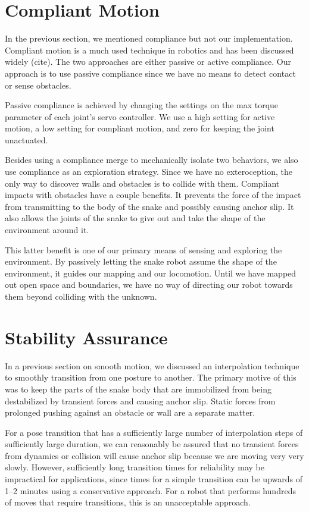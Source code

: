 \section{Compliant Motion}
\label{compliantmotion}

In the previous section, we mentioned compliance but not our implementation. Compliant motion is a much used technique in robotics and has been discussed widely (cite). The two approaches are either passive or active compliance. Our approach is to use passive compliance since we have no means to detect contact or sense obstacles.

Passive compliance is achieved by changing the settings on the max torque parameter of each joint's servo controller. We use a high setting for active motion, a low setting for compliant motion, and zero for keeping the joint unactuated.

Besides using a compliance merge to mechanically isolate two behaviors, we also use compliance as an exploration strategy. Since we have no exteroception, the only way to discover walls and obstacles is to collide with them. Compliant impacts with obstacles have a couple benefits. It prevents the force of the impact from transmitting to the body of the snake and possibly causing anchor slip. It also allows the joints of the snake to give out and take the shape of the environment around it. 

This latter benefit is one of our primary means of sensing and exploring the environment. By passively letting the snake robot assume the shape of the environment, it guides our mapping and our locomotion. Until we have mapped out open space and boundaries, we have no way of directing our robot towards them beyond colliding with the unknown.

\section{Stability Assurance}
\label{sec:stability}

In a previous section on smooth motion, we discussed an interpolation technique to smoothly transition from one posture to another. The primary motive of this was to keep the parts of the snake body that are immobilized from being destabilized by transient forces and causing anchor slip. Static forces from prolonged pushing against an obstacle or wall are a separate matter.

For a pose transition that has a sufficiently large number of interpolation steps of sufficiently large duration, we can reasonably be assured that no transient forces from dynamics or collision will cause anchor slip because we are moving very very slowly. However, sufficiently long transition times for reliability may be impractical for applications, since times for a simple transition can be upwards of 1--2 minutes using a conservative approach. For a robot that performs hundreds of moves that require transitions, this is an unacceptable approach.

